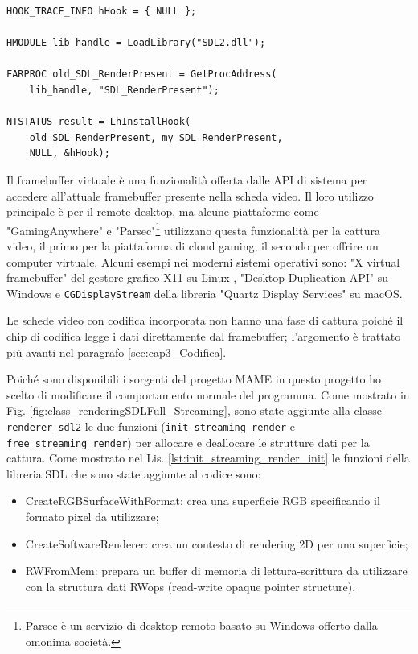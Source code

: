 \begin{lstlisting}[caption=Codice di hook per la libreria SDL, label={lst:hookCode}]
HOOK_TRACE_INFO hHook = { NULL };

HMODULE lib_handle = LoadLibrary("SDL2.dll");

FARPROC old_SDL_RenderPresent =	GetProcAddress(
	lib_handle, "SDL_RenderPresent");

NTSTATUS result = LhInstallHook(
	old_SDL_RenderPresent, my_SDL_RenderPresent,
	NULL, &hHook);
\end{lstlisting}

Il framebuffer virtuale è una funzionalità offerta dalle API di sistema per accedere all'attuale framebuffer presente nella scheda video. Il loro utilizzo principale è per il remote desktop, ma alcune piattaforme come "GamingAnywhere" \parencite{GamingAnywhere} e "Parsec"\footnote{Parsec è un servizio di desktop remoto basato su Windows offerto dalla omonima società.} \parencite{TheTechnologyBehindALowLatencyCloudGamingService} utilizzano questa funzionalità per la cattura video, il primo per la piattaforma di cloud gaming, il secondo per offrire un computer virtuale. Alcuni esempi nei moderni sistemi operativi sono: "X virtual framebuffer" del gestore grafico X11 su Linux \parencite{XVFB}, "Desktop Duplication API" su Windows \parencite{DesktopDuplicationAPI} e \verb|CGDisplayStream| della libreria "Quartz Display Services" su macOS.

Le schede video con codifica incorporata non hanno una fase di cattura poiché il chip di codifica legge i dati direttamente dal framebuffer; l'argomento è trattato più avanti nel paragrafo \ref{sec:cap3_Codifica}.

Poiché sono disponibili i sorgenti del progetto MAME in questo progetto ho scelto di modificare il comportamento normale del programma. Come mostrato in Fig. \ref{fig:class_renderingSDLFull_Streaming}, sono state aggiunte alla classe \verb|renderer_sdl2| le due funzioni (\verb|init_streaming_render| e \verb|free_streaming_render|) per allocare e deallocare le strutture dati per la cattura. Come mostrato nel Lis. \ref{lst:init_streaming_render_init} le funzioni della libreria SDL che sono state aggiunte al codice sono:

\begin{itemize}
	\item CreateRGBSurfaceWithFormat: crea una superficie RGB specificando il formato pixel da utilizzare;	
	\item CreateSoftwareRenderer: crea un contesto di rendering 2D per una superficie;
	\item RWFromMem: prepara un buffer di memoria di lettura-scrittura da utilizzare con la struttura dati RWops (read-write opaque pointer structure).	
\end{itemize}

